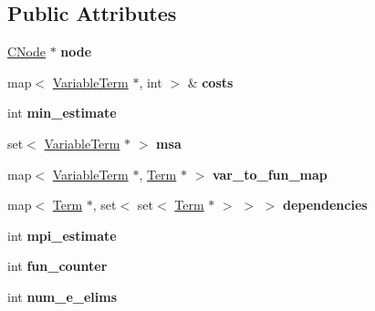 \subsection*{\-Public \-Attributes}
\begin{DoxyCompactItemize}
\item 
\hypertarget{classMSAFinder_a4f3a5aabfec12ac2c746d73bff086fad}{\hyperlink{classCNode}{\-C\-Node} $\ast$ {\bfseries node}}\label{classMSAFinder_a4f3a5aabfec12ac2c746d73bff086fad}

\item 
\hypertarget{classMSAFinder_aec0b42aac87eec1e9ab9ea609dc33a73}{map$<$ \hyperlink{classVariableTerm}{\-Variable\-Term} $\ast$, int $>$ \& {\bfseries costs}}\label{classMSAFinder_aec0b42aac87eec1e9ab9ea609dc33a73}

\item 
\hypertarget{classMSAFinder_a85e3b87a536e1ade8780db1ffa196ab6}{int {\bfseries min\-\_\-estimate}}\label{classMSAFinder_a85e3b87a536e1ade8780db1ffa196ab6}

\item 
\hypertarget{classMSAFinder_aef83482fbb0c7eae2885683b6004cc8e}{set$<$ \hyperlink{classVariableTerm}{\-Variable\-Term} $\ast$ $>$ {\bfseries msa}}\label{classMSAFinder_aef83482fbb0c7eae2885683b6004cc8e}

\item 
\hypertarget{classMSAFinder_af202e914a39d5288888d69d43f42cc41}{map$<$ \hyperlink{classVariableTerm}{\-Variable\-Term} $\ast$, \hyperlink{classTerm}{\-Term} $\ast$ $>$ {\bfseries var\-\_\-to\-\_\-fun\-\_\-map}}\label{classMSAFinder_af202e914a39d5288888d69d43f42cc41}

\item 
\hypertarget{classMSAFinder_a3f487ac299a4a57c44fbffc94ffeeb8e}{map$<$ \hyperlink{classTerm}{\-Term} $\ast$, set$<$ set$<$ \hyperlink{classTerm}{\-Term} $\ast$ $>$ $>$ $>$ {\bfseries dependencies}}\label{classMSAFinder_a3f487ac299a4a57c44fbffc94ffeeb8e}

\item 
\hypertarget{classMSAFinder_a342d81bbf463c5924cd1d673447b9b16}{int {\bfseries mpi\-\_\-estimate}}\label{classMSAFinder_a342d81bbf463c5924cd1d673447b9b16}

\item 
\hypertarget{classMSAFinder_a419dd9b3e2bdef459a813a1b3c85d286}{int {\bfseries fun\-\_\-counter}}\label{classMSAFinder_a419dd9b3e2bdef459a813a1b3c85d286}

\item 
\hypertarget{classMSAFinder_a5e2ee66762738511ae6505d702d39f83}{int {\bfseries num\-\_\-e\-\_\-elims}}\label{classMSAFinder_a5e2ee66762738511ae6505d702d39f83}


\end{DoxyCompactItemize}
